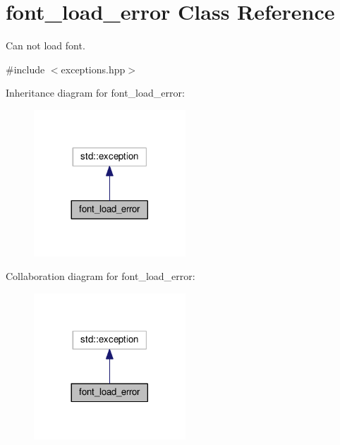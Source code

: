 \hypertarget{classfont__load__error}{}\section{font\+\_\+load\+\_\+error Class Reference}
\label{classfont__load__error}


Can not load font.  




{\ttfamily \#include $<$exceptions.\+hpp$>$}



Inheritance diagram for font\+\_\+load\+\_\+error\+:\nopagebreak
\begin{figure}[H]
\begin{center}
\leavevmode
\includegraphics[width=161pt]{classfont__load__error__inherit__graph}
\end{center}
\end{figure}


Collaboration diagram for font\+\_\+load\+\_\+error\+:\nopagebreak
\begin{figure}[H]
\begin{center}
\leavevmode
\includegraphics[width=161pt]{classfont__load__error__coll__graph}
\end{center}
\end{figure}
